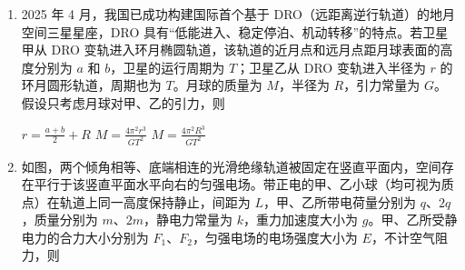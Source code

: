 \documentclass[\gkver]{gaokaozhenti}
\begin{document}
\begin{enumerate}
{B．若将副线圈匝数调为总匝数的 $\frac{1}{3}$，根据变压比可知，输出电压 $U_{2}' = \frac{\frac{1}{3}n_{2}}{n_{1}}U_{1} = 12 \UV$，则副线圈电流变为 $I_{2}' = \frac{U_{2}'}{R} = 2 \UA$，故 B 正确；

C．输入端电压调为 $u = 12\sqrt{2}\sin(50\pi t) \UV$ 时，其有效值不变，不会导致电流的变化，仍然为 $I = \frac{U_{2}}{R} = 3.0 \UA$，故 C 错误；

D．将输入电压峰值减小一半，则输入电压有效值变为 $U_{1}'' = \frac{\frac{1}{2}U_{m}}{\sqrt{2}} = 6 \UV$，输出电压 $U_{2}'' = \frac{0.5n_{2}}{n_{1}}U_{1}'' = 9 \UV$，副线圈电流变为 $I_{2}'' = \frac{U_{2}''}{R} = 1.5 \UA$，故 D 错误。

故选 B。
}

\item
2025 年 4 月，我国已成功构建国际首个基于 DRO（远距离逆行轨道）的地月空间三星星座，DRO 具有“低能进入、稳定停泊、机动转移”的特点。若卫星甲从 DRO 变轨进入环月椭圆轨道，该轨道的近月点和远月点距月球表面的高度分别为 $a$ 和 $b$，卫星的运行周期为 $T$；卫星乙从 DRO 变轨进入半径为 $r$ 的环月圆形轨道，周期也为 $T$。月球的质量为 $M$，半径为 $R$，引力常量为 $G$。假设只考虑月球对甲、乙的引力，则

{$r = \frac{a + b}{2} + R$}
{$M = \frac{4\pi^{2}r^{3}}{GT^{2}}$}
{$M = \frac{4\pi^{2}R^{3}}{GT^{2}}$}


\item
如图，两个倾角相等、底端相连的光滑绝缘轨道被固定在竖直平面内，空间存在平行于该竖直平面水平向右的匀强电场。带正电的甲、乙小球（均可视为质点）在轨道上同一高度保持静止，间距为 $L$，甲、乙所带电荷量分别为 $q$、$2q$，质量分别为 $m$、$2m$，静电力常量为 $k$，重力加速度大小为 $g$。甲、乙所受静电力的合力大小分别为 $F_{1}$、$F_{2}$，匀强电场的电场强度大小为 $E$，不计空气阻力，则


\end{enumerate}
\end{document}
